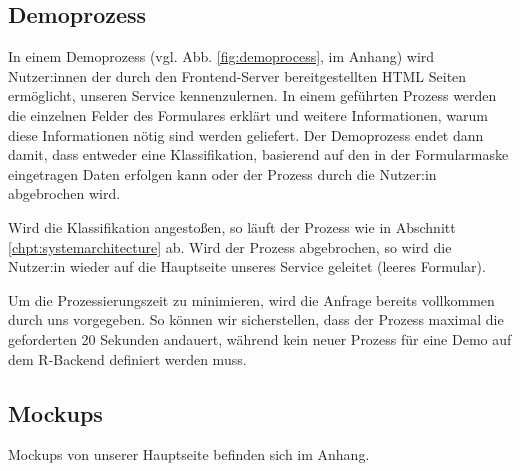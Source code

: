 \documentclass[a4paper,12pt]{article}
\begin{document}
\subsection{Demoprozess}
In einem Demoprozess (vgl. Abb. \ref{fig:demoprocess}, im Anhang) wird Nutzer:innen der durch den Frontend-Server bereitgestellten HTML Seiten ermöglicht, unseren Service kennenzulernen. In einem geführten Prozess werden die einzelnen Felder des Formulares erklärt und weitere Informationen, warum diese Informationen nötig sind werden geliefert. Der Demoprozess endet dann damit, dass entweder eine Klassifikation, basierend auf den in der Formularmaske eingetragen Daten erfolgen kann oder der Prozess durch die Nutzer:in abgebrochen wird.
\par
Wird die Klassifikation angestoßen, so läuft der Prozess wie in Abschnitt \ref{chpt:systemarchitecture} ab. Wird der Prozess abgebrochen, so wird die Nutzer:in wieder auf die Hauptseite unseres Service geleitet (leeres Formular).
\par
Um die Prozessierungszeit zu minimieren, wird die Anfrage bereits vollkommen durch uns vorgegeben. So können wir sicherstellen, dass der Prozess maximal die geforderten 20 Sekunden andauert, während kein neuer Prozess für eine Demo auf dem R-Backend definiert werden muss.




\subsection{Mockups}
Mockups von unserer Hauptseite befinden sich im Anhang.


\end{document}
